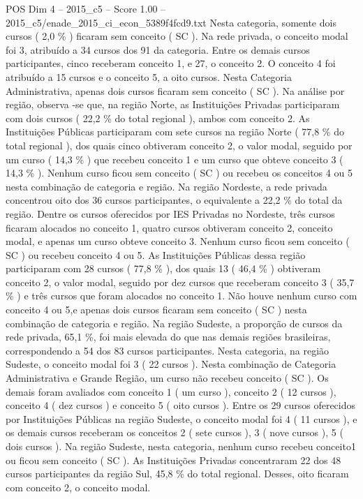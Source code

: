 \begin{textsample}{POS Dim 4 – 2015\_c5 – Score 1.00 – 2015\_c5/enade\_2015\_ci\_econ\_5389f4fcd9.txt}
Nesta categoria, somente dois cursos ( 2,0 \% ) ficaram sem conceito ( SC ).
Na rede privada, o conceito modal foi 3, atribuído a 34 cursos dos 91 da categoria.
Entre os demais cursos participantes, cinco receberam conceito 1, e 27, o conceito 2.
O conceito 4 foi atribuído a 15 cursos e o conceito 5, a oito cursos.
Nesta Categoria Administrativa, apenas dois cursos ficaram sem conceito ( SC ).
Na análise por região, observa -se que, na região Norte, as Instituições Privadas participaram com dois cursos ( 22,2 \% do total regional ), ambos com conceito 2.
As Instituições Públicas participaram com sete cursos na região Norte ( 77,8 \% do total regional ), dos quais cinco obtiveram conceito 2, o valor modal, seguido por um curso ( 14,3 \% ) que recebeu conceito 1 e um curso que obteve conceito 3 ( 14,3 \% ).
Nenhum curso ficou sem conceito ( SC ) ou recebeu os conceitos 4 ou 5 nesta combinação de categoria e região.
Na região Nordeste, a rede privada concentrou oito dos 36 cursos participantes, o equivalente a 22,2 \% do total da região.
Dentre os cursos oferecidos por IES Privadas no Nordeste, três cursos ficaram alocados no conceito 1, quatro cursos obtiveram conceito 2, conceito modal, e apenas um curso obteve conceito 3.
Nenhum curso ficou sem conceito ( SC ) ou recebeu conceito 4 ou 5.
As Instituições Públicas dessa região participaram com 28 cursos ( 77,8 \% ), dos quais 13 ( 46,4 \% ) obtiveram conceito 2, o valor modal, seguido por dez cursos que receberam conceito 3 ( 35,7 \% ) e três cursos que foram alocados no conceito 1.
Não houve nenhum curso com conceito 4 ou 5,e apenas dois cursos ficaram sem conceito ( SC ) nesta combinação de categoria e região.
Na região Sudeste, a proporção de cursos da rede privada, 65,1 \%, foi mais elevada do que nas demais regiões brasileiras, correspondendo a 54 dos 83 cursos participantes.
Nesta categoria, na região Sudeste, o conceito modal foi 3 ( 22 cursos ).
Nesta combinação de Categoria Administrativa e Grande Região, um curso não recebeu conceito ( SC ).
Os demais foram avaliados com conceito 1 ( um curso ), conceito 2 ( 12 cursos ), conceito 4 ( dez cursos ) e conceito 5 ( oito cursos ).
Entre os 29 cursos oferecidos por Instituições Públicas na região Sudeste, o conceito modal foi 4 ( 11 cursos ), e os demais cursos receberam os conceitos 2 ( sete cursos ), 3 ( nove cursos ), 5 ( dois cursos ).
Na região Sudeste, nesta categoria, nenhum curso recebeu conceito1 ou ficou sem conceito ( SC ).
As Instituições Privadas concentraram 22 dos 48 cursos participantes da região Sul, 45,8 \% do total regional.
Desses, oito ficaram com conceito 2, o conceito modal.

\end{textsample}
